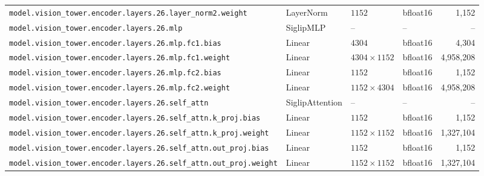 \documentclass[10pt,a4paper]{article}
\theoremstyle{definition}
\begin{document}
\begin{appendices}
{\begin{longtable}{p{6.8cm}>{\raggedright\arraybackslash}p{3.3cm}llr}
\texttt{model.\allowbreak{}vision\_tower.\allowbreak{}encoder.\allowbreak{}layers.\allowbreak{}26.\allowbreak{}layer\_norm2.\allowbreak{}weight} & Layer\allowbreak{}Norm & $1152$ & bfloat16 & 1,152 \\
\texttt{model.\allowbreak{}vision\_tower.\allowbreak{}encoder.\allowbreak{}layers.\allowbreak{}26.\allowbreak{}mlp} & Siglip\allowbreak{}MLP & -- & -- & -- \\
\texttt{model.\allowbreak{}vision\_tower.\allowbreak{}encoder.\allowbreak{}layers.\allowbreak{}26.\allowbreak{}mlp.\allowbreak{}fc1.\allowbreak{}bias} & Linear & $4304$ & bfloat16 & 4,304 \\
\texttt{model.\allowbreak{}vision\_tower.\allowbreak{}encoder.\allowbreak{}layers.\allowbreak{}26.\allowbreak{}mlp.\allowbreak{}fc1.\allowbreak{}weight} & Linear & $4304 \times 1152$ & bfloat16 & 4,958,208 \\
\texttt{model.\allowbreak{}vision\_tower.\allowbreak{}encoder.\allowbreak{}layers.\allowbreak{}26.\allowbreak{}mlp.\allowbreak{}fc2.\allowbreak{}bias} & Linear & $1152$ & bfloat16 & 1,152 \\
\texttt{model.\allowbreak{}vision\_tower.\allowbreak{}encoder.\allowbreak{}layers.\allowbreak{}26.\allowbreak{}mlp.\allowbreak{}fc2.\allowbreak{}weight} & Linear & $1152 \times 4304$ & bfloat16 & 4,958,208 \\
\texttt{model.\allowbreak{}vision\_tower.\allowbreak{}encoder.\allowbreak{}layers.\allowbreak{}26.\allowbreak{}self\_attn} & Siglip\allowbreak{}Attention & -- & -- & -- \\
\texttt{model.\allowbreak{}vision\_tower.\allowbreak{}encoder.\allowbreak{}layers.\allowbreak{}26.\allowbreak{}self\_attn.\allowbreak{}k\_proj.\allowbreak{}bias} & Linear & $1152$ & bfloat16 & 1,152 \\
\texttt{model.\allowbreak{}vision\_tower.\allowbreak{}encoder.\allowbreak{}layers.\allowbreak{}26.\allowbreak{}self\_attn.\allowbreak{}k\_proj.\allowbreak{}weight} & Linear & $1152 \times 1152$ & bfloat16 & 1,327,104 \\
\texttt{model.\allowbreak{}vision\_tower.\allowbreak{}encoder.\allowbreak{}layers.\allowbreak{}26.\allowbreak{}self\_attn.\allowbreak{}out\_proj.\allowbreak{}bias} & Linear & $1152$ & bfloat16 & 1,152 \\
\texttt{model.\allowbreak{}vision\_tower.\allowbreak{}encoder.\allowbreak{}layers.\allowbreak{}26.\allowbreak{}self\_attn.\allowbreak{}out\_proj.\allowbreak{}weight} & Linear & $1152 \times 1152$ & bfloat16 & 1,327,104 \\

\end{longtable}}
\end{appendices}
\end{document}
